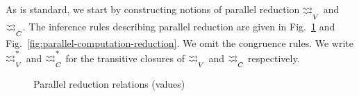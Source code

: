 \documentclass[acmsmall, screen, review, anonymous]{acmart}
\makeatletter
\theoremstyle{definition}
\newcommand{\indintro}[3]{{#1}(#2,\, #3)}
\newcommand{\retname}{\mathtt{ret}}
\newcommand{\ret}[1]{\mathop{\retname}(#1)}
\newcommand{\indelimname}{\mathtt{rec}}
\newcommand{\indelim}[2]{\mathop{\indelimname} #1 \,\{#2\}}
\newcommand{\indretcase}[2]{\retname(#1) \Rightarrow #2}
\newcommand{\indcase}[4]{#1(#2, #3) \Rightarrow #4}
\newcommand{\seq}{\,;\,}
\newcommand{\fstname}{\mathop{\pi_1}}
\newcommand{\fst}[1]{\fstname #1}
\newcommand{\sndname}{\mathop{\pi_2}}
\newcommand{\snd}[1]{\sndname #1}
\newcommand{\inlname}{\mathop{\mathtt{in}_L}}
\newcommand{\inl}[1]{\inlname #1}
\newcommand{\inrname}{\mathop{\mathtt{in}_R}}
\newcommand{\inr}[1]{\inrname #1}
\newcommand{\casename}{\mathtt{case}}
\newcommand{\casemname}{\casename^{m}}
\newcommand{\casem}[5]{\mathop{\casemname} #1 \,\{\,\inl{#2} \Rightarrow #3 \seq \inr{#4} \Rightarrow #5 \,\}}
\newcommand{\abs}[2]{\lambda#1.\,#2}
\newcommand{\app}[2]{#1\,#2}
\newcommand{\returnname}{\mathop{\mathtt{return}}}
\newcommand{\return}[1]{\returnname\, #1}
\newcommand{\letvname}{\mathop{\mathtt{let}}}
\newcommand{\letv}[3]{\letvname #1 = #2 \mathop{\mathtt{in}} #3}
\newcommand{\gboxname}{\mathop{\mathtt{box}}}
\newcommand{\gbox}[1]{\gboxname #1}
\newcommand{\gunbox}[3]{\mathop{\mathtt{let}} (\gbox{#1}) = #2 \mathop{\mathtt{in}} #3}
\newcommand{\grunname}{\mathtt{run}}
\newcommand{\grun}[1]{\mathop{\grunname}(#1)}
\newcommand{\sub}[2]{[#1\backslash#2]}
\newcommand{\sbst}[3]{#1\sub{#2}{#3}}
\newcommand{\drightsquigarrow}{\begin{array}{@{}c@{}}\rightsquigarrow \\[-8pt] \rightsquigarrow\end{array}}
\newcommand{\parastepstoname}{\drightsquigarrow}
\newcommand{\parastepstov}{\mathrel{\parastepstoname_{V}}}
\newcommand{\parastepstoc}{\mathrel{\parastepstoname_{C}}}
\newcommand{\parareducestoname}{\parastepstoname^{*}}
\newcommand{\parareducestov}{\mathrel{\parareducestoname_{V}}}
\newcommand{\parareducestoc}{\mathrel{\parareducestoname_{C}}}
\makeatother
\begin{document}
As is standard, we start by constructing notions of parallel reduction
$\parastepstov$ and $\parastepstoc$. The inference rules describing
parallel reduction are given in Fig.~\ref{fig:parallel-value-reduction}
and Fig.~\ref{fig:parallel-computation-reduction}. We omit the
congruence rules. We write $\parareducestov$ and $\parareducestoc$ for
the transitive closures of $\parastepstov$ and $\parastepstoc$
respectively.
\begin{figure}
\caption{Parallel reduction relations (values)}
\label{fig:parallel-value-reduction}
\end{figure}
\end{document}
